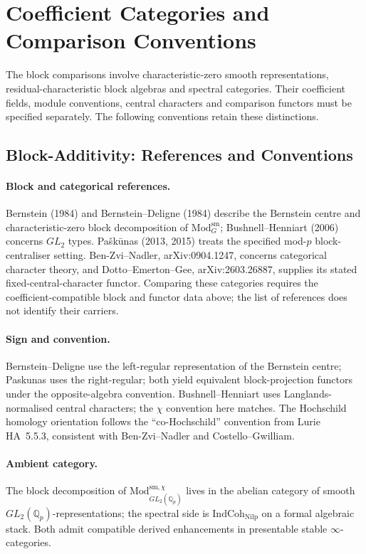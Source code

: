 \section{Coefficient Categories and Comparison Conventions}
\label{v4-arith:w5-f:F1a3-AB:source-comparison}

The block comparisons involve characteristic-zero smooth representations,
residual-characteristic block algebras and spectral categories.
Their coefficient fields, module conventions, central characters and
comparison functors must be specified separately. The following
conventions retain these distinctions.

\subsection{Block-Additivity: References and Conventions}
\label{v4-arith:w5-f:F1a3-AB:comparison-block-additivity}

\paragraph{Block and categorical references.}
Bernstein (1984) and Bernstein--Deligne (1984) describe the Bernstein
centre and characteristic-zero block decomposition of
$\mathrm{Mod}^{\mathrm{sm}}_G$; Bushnell--Henniart (2006) concerns
$GL_2$ types. Pa{\v s}k{\=u}nas (2013, 2015) treats the specified
mod-$p$ block-centraliser setting. Ben-Zvi--Nadler,
arXiv:0904.1247, concerns categorical character theory, and
Dotto--Emerton--Gee, arXiv:2603.26887, supplies its stated
fixed-central-character functor. Comparing these categories requires
the coefficient-compatible block and functor data above; the list of
references does not identify their carriers.

\paragraph{Sign and convention.} Bernstein--Deligne use the left-regular
representation of the Bernstein centre; Paskunas uses the right-regular;
both yield equivalent block-projection functors under the
opposite-algebra convention. Bushnell--Henniart uses
Langlands-normalised central characters; the \(\chi\) convention here
matches. The Hochschild homology orientation follows the ``co-Hochschild''
convention from Lurie HA~5.5.3, consistent with Ben-Zvi--Nadler and
Costello--Gwilliam.

\paragraph{Ambient category.} The block decomposition of
\(\mathrm{Mod}^{\mathrm{sm},\chi}_{GL_{2}(\mathbb{Q}_{p})}\) lives in the
abelian category of smooth \(GL_{2}(\mathbb{Q}_{p})\)-representations;
the spectral side is \(\mathrm{IndCoh}_{\mathrm{Nilp}}\) on a formal
algebraic stack. Both admit compatible derived enhancements in
presentable stable \(\infty\)-categories.

